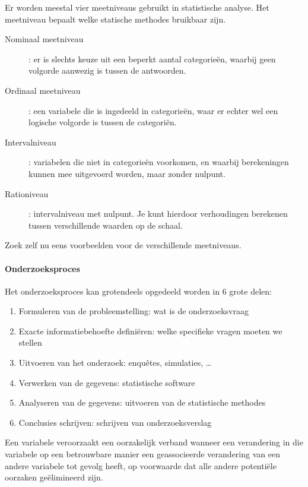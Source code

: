 Er worden meestal vier meetniveaus gebruikt in statistische analyse. Het meetniveau bepaalt welke statische methodes bruikbaar zijn. 
\begin{description}
	\item [Nominaal meetniveau] : er is slechts keuze uit een beperkt aantal categorie\"en, waarbij geen volgorde aanwezig is tussen de antwoorden.
	\item [Ordinaal meetniveau] : een variabele die is ingedeeld in categorie\"en, waar er echter wel een logische volgorde is tussen de categori\"en. 
	\item [Intervalniveau] : variabelen die niet in categorie\"en voorkomen, en waarbij berekeningen kunnen mee uitgevoerd worden, maar zonder nulpunt.
	\item [Rationiveau] : intervalniveau met nulpunt. Je kunt hierdoor verhoudingen berekenen tussen verschillende waarden op de schaal.
\end{description}

\begin{exercise}
	Zoek zelf nu eens voorbeelden voor de verschillende meetniveaus.
\end{exercise}

\paragraph{Onderzoeksproces}
Het onderzoeksproces kan grotendeels opgedeeld worden in 6 grote delen:
\begin{enumerate}
	\item Formuleren van de probleemstelling: wat is de onderzoeksvraag
	\item Exacte informatiebehoefte defini\"eren: welke specifieke vragen moeten we stellen
	\item Uitvoeren van het onderzoek: enqu\^etes, simulaties, \dots
	\item Verwerken van de gegevens: statistische software
	\item Analyseren van de gegevens: uitvoeren van de statistische methodes
	\item Conclusies schrijven: schrijven van onderzoeksverslag
\end{enumerate}

\begin{definition}
 Een variabele veroorzaakt een oorzakelijk verband wanneer een verandering in die variabele op een betrouwbare manier een geassocieerde verandering van een andere variabele tot gevolg heeft, op voorwaarde dat alle andere potenti\"ele oorzaken ge\"elimineerd zijn.
\end{definition}

